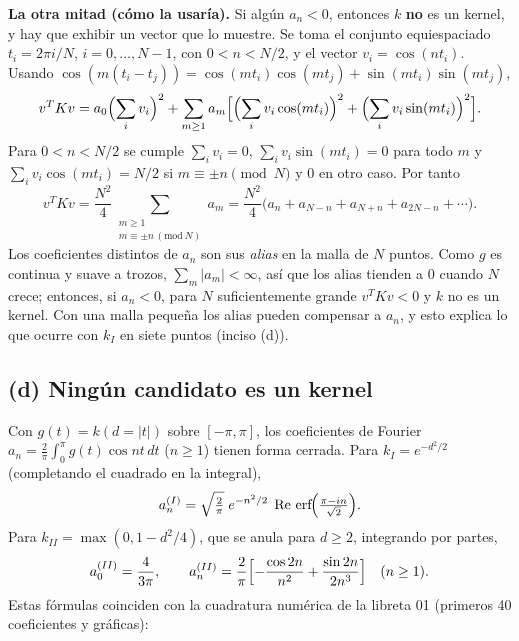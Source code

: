 \textbf{La otra mitad (cómo la usaría).} Si algún $a_n<0$, entonces $k$
\textbf{no} es un kernel, y hay que exhibir un vector que lo muestre. Se toma el
conjunto equiespaciado $t_i=2\pi i/N$, $i=0,\dots,N-1$, con $0<n<N/2$, y el
vector $v_i=\cos(nt_i)$. Usando
$\cos(m(t_i-t_j))=\cos(mt_i)\cos(mt_j)+\sin(mt_i)\sin(mt_j)$,
\[
v^{T}Kv=a_0\Bigl(\sum_i v_i\Bigr)^2+\sum_{m\ge1}a_m\Bigl[\Bigl(\sum_i v_i\cos(mt_i)\Bigr)^2+\Bigl(\sum_i v_i\sin(mt_i)\Bigr)^2\Bigr].
\]
Para $0<n<N/2$ se cumple $\sum_i v_i=0$, $\sum_i v_i\sin(mt_i)=0$ para todo $m$
y $\sum_i v_i\cos(mt_i)=N/2$ si $m\equiv\pm n \pmod N$ y $0$ en otro caso.
Por tanto
\[
v^{T}Kv=\frac{N^{2}}{4}\sum_{\substack{m\ge1\\ m\equiv\pm n\,(\mathrm{mod}\ N)}}a_m
=\frac{N^{2}}{4}\bigl(a_n+a_{N-n}+a_{N+n}+a_{2N-n}+\cdots\bigr).
\]
Los coeficientes distintos de $a_n$ son sus \emph{alias} en la malla de $N$
puntos. Como $g$ es continua y suave a trozos, $\sum_m|a_m|<\infty$, así que
los alias tienden a $0$ cuando $N$ crece; entonces, si $a_n<0$, para $N$
suficientemente grande $v^TKv<0$ y $k$ no es un kernel. Con una malla pequeña
los alias pueden compensar a $a_n$, y esto explica lo que ocurre con $k_I$ en
siete puntos (inciso (d)).

\subsection*{(d) Ningún candidato es un kernel}

Con $g(t)=k(d=|t|)$ sobre $[-\pi,\pi]$, los coeficientes de Fourier
$a_n=\frac{2}{\pi}\int_0^\pi g(t)\cos nt\,dt$ ($n\ge1$) tienen forma cerrada.
Para $k_I=e^{-d^2/2}$ (completando el cuadrado en la integral),
\[
a_n^{(I)}=\sqrt{\tfrac{2}{\pi}}\;e^{-n^2/2}\;\operatorname{Re}\,\operatorname{erf}\!\Bigl(\tfrac{\pi-in}{\sqrt2}\Bigr).
\]
Para $k_{II}=\max(0,1-d^2/4)$, que se anula para $d\ge2$, integrando por partes,
\[
a_0^{(II)}=\frac{4}{3\pi},\qquad
a_n^{(II)}=\frac{2}{\pi}\Bigl[-\frac{\cos 2n}{n^{2}}+\frac{\sin 2n}{2n^{3}}\Bigr]\quad(n\ge1).
\]
Estas fórmulas coinciden con la cuadratura numérica de la libreta 01
(primeros 40 coeficientes y gráficas):

